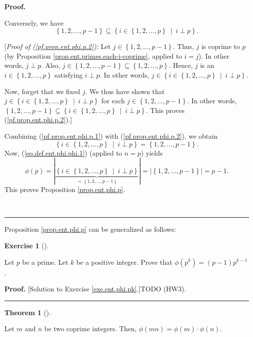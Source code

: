 \documentclass[numbers=enddot,12pt,final,onecolumn,notitlepage]{scrartcl}%
\newcounter{exer}
\numberwithin{exer}{subsection}
\theoremstyle{definition}
\newtheorem{theo}{Theorem}[subsection]
\newenvironment{theorem}[1][]
{\begin{theo}[#1]\begin{leftbar}}
{\end{leftbar}\end{theo}}
\newtheorem{exmp}[exer]{Exercise}
\newenvironment{exercise}[1][]
{\begin{exmp}[#1]\begin{leftbar}}
{\end{leftbar}\end{exmp}}
\newenvironment{fineprint}{\begin{small}}{\end{small}}
\newenvironment{proof}[1][Proof]{\noindent\textbf{#1.} }{\ \rule{0.5em}{0.5em}}
\begin{document}
\begin{proof}
\begin{fineprint}
Conversely, we have%
\begin{equation}
\left\{  1,2,\ldots,p-1\right\}  \subseteq\left\{  i\in\left\{  1,2,\ldots
,p\right\}  \ \mid\ i\perp p\right\}  . \label{pf.prop.ent.phi.p.2}%
\end{equation}


[\textit{Proof of (\ref{pf.prop.ent.phi.p.2}):} Let $j\in\left\{
1,2,\ldots,p-1\right\}  $. Thus, $j$ is coprime to $p$ (by Proposition
\ref{prop.ent.primes.each-i-coprime}, applied to $i=j$). In other words,
$j\perp p$. Also, $j\in\left\{  1,2,\ldots,p-1\right\}  \subseteq\left\{
1,2,\ldots,p\right\}  $. Hence, $j$ is an $i\in\left\{  1,2,\ldots,p\right\}
$ satisfying $i\perp p$. In other words, $j\in\left\{  i\in\left\{
1,2,\ldots,p\right\}  \ \mid\ i\perp p\right\}  $.

Now, forget that we fixed $j$. We thus have shown that $j\in\left\{
i\in\left\{  1,2,\ldots,p\right\}  \ \mid\ i\perp p\right\}  $ for each
$j\in\left\{  1,2,\ldots,p-1\right\}  $. In other words, $\left\{
1,2,\ldots,p-1\right\}  \subseteq\left\{  i\in\left\{  1,2,\ldots,p\right\}
\ \mid\ i\perp p\right\}  $. This proves (\ref{pf.prop.ent.phi.p.2}).]

Combining (\ref{pf.prop.ent.phi.p.1}) with (\ref{pf.prop.ent.phi.p.2}), we
obtain%
\[
\left\{  i\in\left\{  1,2,\ldots,p\right\}  \ \mid\ i\perp p\right\}
=\left\{  1,2,\ldots,p-1\right\}  .
\]
Now, (\ref{eq.def.ent.phi.phi.1}) (applied to $n=p$) yields%
\[
\phi\left(  p\right)  =\left\vert \underbrace{\left\{  i\in\left\{
1,2,\ldots,p\right\}  \ \mid\ i\perp p\right\}  }_{=\left\{  1,2,\ldots
,p-1\right\}  }\right\vert =\left\vert \left\{  1,2,\ldots,p-1\right\}
\right\vert =p-1.
\]
This proves Proposition \ref{prop.ent.phi.p}.
\end{fineprint}
\end{proof}

Proposition \ref{prop.ent.phi.p} can be generalized as follows:

\begin{exercise}
\label{exe.ent.phi.pk}Let $p$ be a prime. Let $k$ be a positive integer. Prove
that $\phi\left(  p^{k}\right)  =\left(  p-1\right)  p^{k-1}$.
\end{exercise}

\begin{proof}
[Solution to Exercise \ref{exe.ent.phi.pk}.]TODO (HW3).
\end{proof}

\begin{theorem}
\label{thm.ent.phi.mult}Let $m$ and $n$ be two coprime integers. Then,
$\phi\left(  mn\right)  =\phi\left(  m\right)  \cdot\phi\left(  n\right)  $.
\end{theorem}
\end{document}
